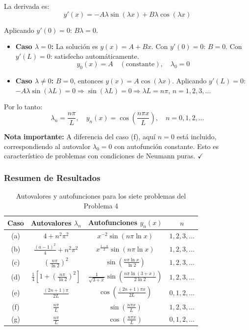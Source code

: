 \documentclass[a4paper]{article}
\begin{document}
La derivada es:
$$
y'(x) = -A\lambda \sin(\lambda x) + B\lambda \cos(\lambda x)
$$

Aplicando $y'(0) = 0$: $B\lambda = 0$.

\begin{itemize}
    \item \textbf{Caso $\lambda = 0$:} La solución es $y(x) = A + Bx$. Con $y'(0) = 0$: $B = 0$. Con $y'(L) = 0$: satisfecho automáticamente.
    $$
    y_0(x) = A \quad (\text{constante}), \quad \lambda_0 = 0
    $$
    
    \item \textbf{Caso $\lambda \neq 0$:} $B = 0$, entonces $y(x) = A \cos(\lambda x)$.
    Aplicando $y'(L) = 0$: $-A\lambda \sin(\lambda L) = 0 \Rightarrow \sin(\lambda L) = 0 \Rightarrow \lambda L = n\pi$, $n = 1, 2, 3, \dots$
\end{itemize}

Por lo tanto:
$$
\boxed{\lambda_n = \frac{n\pi}{L}, \quad y_n(x) = \cos\left(\frac{n\pi x}{L}\right), \quad n = 0, 1, 2, \dots}
$$

\textbf{Nota importante:} A diferencia del caso (f), aquí $n = 0$ está incluido, correspondiendo al autovalor $\lambda_0 = 0$ con autofunción constante. Esto es característico de problemas con condiciones de Neumann puras. $\checkmark$

\subsubsection{Resumen de Resultados}

\begin{table}[h]
\centering
\begin{tabular}{|c|c|c|c|}
\hline
\textbf{Caso} & \textbf{Autovalores $\lambda_n$} & \textbf{Autofunciones $y_n(x)$} & \textbf{$n$} \\
\hline
(a) & $4 + n^2\pi^2$ & $x^{-2} \sin(n\pi \ln x)$ & $1, 2, 3, \dots$ \\
\hline
(b) & $\frac{(a-1)^2}{4} + n^2\pi^2$ & $x^{\frac{1-a}{2}} \sin(n\pi \ln x)$ & $1, 2, 3, \dots$ \\
\hline
(c) & $\left(\frac{n\pi}{\ln 2}\right)^2$ & $\sin\left(\frac{n\pi \ln x}{\ln 2}\right)$ & $1, 2, 3, \dots$ \\
\hline
(d) & $\frac{1}{4}\left[1 + \left(\frac{n\pi}{\ln 2}\right)^2\right]$ & $\frac{1}{\sqrt{3+x}} \sin\left(\frac{n\pi \ln(3+x)}{2\ln 2}\right)$ & $1, 2, 3, \dots$ \\
\hline
(e) & $\frac{(2n+1)\pi}{2L}$ & $\cos\left(\frac{(2n+1)\pi x}{2L}\right)$ & $0, 1, 2, \dots$ \\
\hline
(f) & $\frac{n\pi}{L}$ & $\sin\left(\frac{n\pi x}{L}\right)$ & $1, 2, 3, \dots$ \\
\hline
(g) & $\frac{n\pi}{L}$ & $\cos\left(\frac{n\pi x}{L}\right)$ & $0, 1, 2, \dots$ \\
\hline
\end{tabular}
\caption{Autovalores y autofunciones para los siete problemas del Problema 4}
\end{table}
\end{document}
